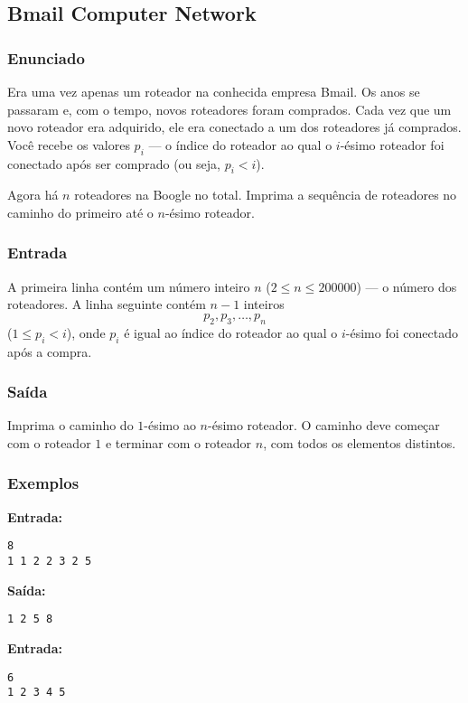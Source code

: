 \subsection{Bmail Computer Network}


\subsubsection*{Enunciado}
Era uma vez apenas um roteador na conhecida empresa Bmail. Os anos se passaram e, com o tempo, novos roteadores foram comprados. Cada vez que um novo roteador era adquirido, ele era conectado a um dos roteadores já comprados. Você recebe os valores $p_i$ --- o índice do roteador ao qual o $i$-ésimo roteador foi conectado após ser comprado (ou seja, $p_i < i$).

Agora há $n$ roteadores na Boogle no total. Imprima a sequência de roteadores no caminho do primeiro até o $n$-ésimo roteador.

\subsubsection*{Entrada}
A primeira linha contém um número inteiro $n$ ($2 \le n \le 200000$) --- o número dos roteadores. A linha seguinte contém $n-1$ inteiros 
\[
p_2, p_3, \dots, p_n
\]
($1 \le p_i < i$), onde $p_i$ é igual ao índice do roteador ao qual o $i$-ésimo foi conectado após a compra.

\subsubsection*{Saída}
Imprima o caminho do $1$-ésimo ao $n$-ésimo roteador. O caminho deve começar com o roteador $1$ e terminar com o roteador $n$, com todos os elementos distintos.

\subsubsection*{Exemplos}
\textbf{Entrada:}
\begin{verbatim}
8
1 1 2 2 3 2 5
\end{verbatim}

\textbf{Saída:}
\begin{verbatim}
1 2 5 8 
\end{verbatim}

\textbf{Entrada:}
\begin{verbatim}
6
1 2 3 4 5
\end{verbatim}

